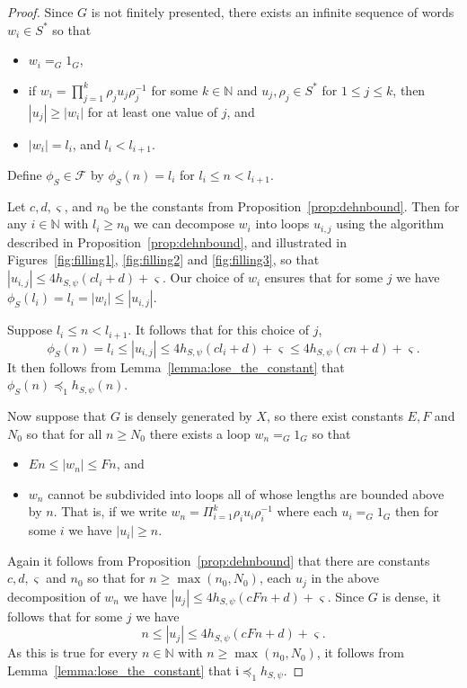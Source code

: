 \documentclass[11pt]{amsart}
\newcommand{\bi}{\begin{itemize}}
\newcommand{\ei}{\end{itemize}}
\newcommand{\cC}{\varsigma}
\newcommand{\preceqF}{\preceq_1}
\theoremstyle{definition}
\newcommand\N{\mathbb N}
\newcommand\F{\mathcal F}
\newcommand{\ii}{\mathfrak{i}}
\renewcommand{\geq}{\geqslant} \renewcommand{\leq}{\leqslant} \renewcommand{\ge}{\geqslant} \renewcommand{\le}{\leqslant}
\begin{document}
\begin{proof}
Since $G$ is not finitely presented, there exists an infinite sequence of words  $w_i\in S^*$ so that
\begin{itemize}[itemsep=5pt]
    \item $w_i =_G 1_G$,
    \item if $w_i=\prod_{j=1}^k \rho_ju_j\rho_j^{-1}$ for some $k \in \N$ and $u_j, \rho_j \in S^*$  for $1\leq j\leq k$, then $|u_j|\geq |w_i|$ for at least one value of $j$, and
    \item $|w_i| = l_i$, and $l_i < l_{i+1}$.
\end{itemize}
Define $\phi_S \in   \F$ by $\phi_S(n) = l_i$ for $l_i \leq  n <  l_{i+1}$.



Let $c,d,\cC$, and $n_0$ be the constants from  Proposition~\ref{prop:dehnbound}. Then for any $i\in\N$ with $l_i\geq n_0$ we can
decompose $w_i$ into  loops $u_{i,j}$ using the algorithm described in Proposition~\ref{prop:dehnbound}, and illustrated in Figures~\ref{fig:filling1}, \ref{fig:filling2} and \ref{fig:filling3}, so that $|u_{i,j}| \leq 4h_{S,\psi}(cl_i+d) + \cC$.
Our choice of $w_i$ ensures that for some $j$ we have  $\phi_S(l_i) = l_i = |w_i| \leq |u_{i,j}|$.



Suppose $l_i \leq n < l_{i+1}$.
It follows that for this choice of $j$,
\[ \phi_S(n) = l_{i}\leq |u_{i,j}| \leq 4h_{S,\psi}(c l_{i} + d) + \cC \leq 4h_{S,\psi}(cn+d)+\cC. \]
It then follows from Lemma~\ref{lemma:lose_the_constant} that
 $\phi_S(n) \preceqF h_{S,\psi}(n)$.



Now suppose that $G$ is densely generated by $X$, so there exist constants $E,F$ and $N_0$ so that for all $n \geq N_0$ there exists a loop $w_n=_G 1_G$ so that
\bi
\item $En \leq |w_n| \leq Fn$, and
\item $w_n$ cannot be subdivided into loops all of whose lengths are bounded above by $n$.  That is, if we write $w_n = \Pi_{i=1}^k \rho_i u_i \rho_i^{-1}$ where each $u_i =_G 1_G$ then for some $i$ we have $|u_i| \geq n$.
\ei
Again it follows from Proposition~\ref{prop:dehnbound} that there are constants $c,d,\cC$ and $n_0$ so that for $n \geq \max(n_0,N_0)$, each $u_j$ in the above decomposition of $w_n$ we have
$|u_j| \leq 4h_{S,\psi}(cFn+d)+\cC.$
Since $G$ is dense, it follows that for some $j$ we have
$$n \leq |u_j|\leq 4h_{S,\psi}(cFn+d)+\cC.$$
As this is true for every $n \in \N$ with $n \geq \max(n_0,N_0)$,
it follows from Lemma~\ref{lemma:lose_the_constant} that $\ii \preceqF h_{S,\psi}$.
\end{proof}
\end{document}

